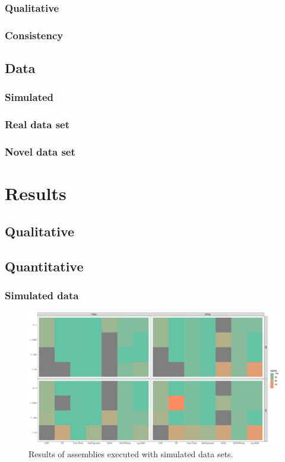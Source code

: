 \subsubsection{Qualitative}
\subsubsection{Consistency}


\subsection{Data}
\subsubsection{Simulated}
\subsubsection{Real data set}
\subsubsection{Novel data set}


\section{Results}
\subsection{Qualitative}

\subsection{Quantitative}
\subsubsection{Simulated data}
\begin{figure}[H]
\centering
\includegraphics[height=.45\textheight, width=.95\textwidth]{Figures/sim_tiles}
\decoRule
\caption[Score of assemblies of simulated data sets]{Results of assemblies executed with simulated data sets.}
\label{fig:sim_tiles}
\end{figure}



